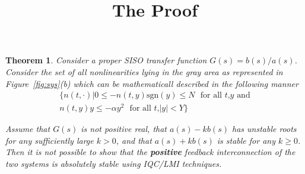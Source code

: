 \documentclass[a4paper,10pt]{article}
\title{The Proof}
\author{}
\newcommand{\sgn}{\mathrm{sgn}}
\newtheorem{thm}{Theorem}[section]
\begin{document}
\maketitle

\begin{thm}
Consider a proper SISO transfer function $G(s)=b(s)/a(s)$. Consider the set of all  nonlinearities lying in the gray area as represented in Figure~\ref{fig:sys}(b)
which can be mathematicall described in the following manner
\begin{align}
	\{n(t,\cdot)| 0\leq -n(t,y)\sgn(y)\leq N~~~\text{for all $t$,$y$ and}\\
		 n(t,y)y\leq -\alpha y^2 ~~~\text{for all $t$,$|y|<Y$} \} 
\end{align}

Assume that $G(s)$ is not positive real, that $a(s)-kb(s)$ has unstable roots for any sufficiently large $k>0$, and that $a(s)+kb(s)$ is stable for any $k\geq 0$.\\
Then it is not possible to show that the \textbf{positive} feedback interconnection of the two systems is absolutely stable using IQC/LMI techniques.
\end{thm}
\end{document}
